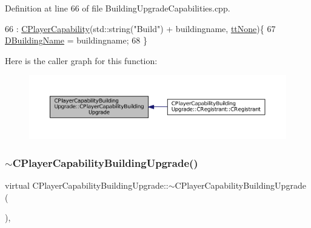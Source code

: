 Definition at line 66 of file Building\+Upgrade\+Capabilities.\+cpp.


\begin{DoxyCode}
66                                                                                                 : 
      \hyperlink{classCPlayerCapability_a303de62aba5d3f65d9a8e013c64a96c1}{CPlayerCapability}(std::string(\textcolor{stringliteral}{"Build"}) + buildingname, \hyperlink{classCPlayerCapability_a9d3450ed1532fd536bd6cbb1e2eef02fac78f0e806a6b0ead030d63c27c9ce929}{ttNone})\{
67     \hyperlink{classCPlayerCapabilityBuildingUpgrade_a244e767a3e669441cfb03c13bf703e64}{DBuildingName} = buildingname;
68 \}
\end{DoxyCode}
Here is the caller graph for this function\+:
\nopagebreak
\begin{figure}[H]
\begin{center}
\leavevmode
\includegraphics[width=350pt]{classCPlayerCapabilityBuildingUpgrade_a80ccec4b17a9e43914bec537dcbe1b9e_icgraph}
\end{center}
\end{figure}
\hypertarget{classCPlayerCapabilityBuildingUpgrade_abcef586e377c86c3da3cd698dca268ef}{}\label{classCPlayerCapabilityBuildingUpgrade_abcef586e377c86c3da3cd698dca268ef} 
\subsubsection{\texorpdfstring{$\sim$\+C\+Player\+Capability\+Building\+Upgrade()}{~CPlayerCapabilityBuildingUpgrade()}}
{\footnotesize\ttfamily virtual C\+Player\+Capability\+Building\+Upgrade\+::$\sim$\+C\+Player\+Capability\+Building\+Upgrade (\begin{DoxyParamCaption}{ }\end{DoxyParamCaption})\hspace{0.3cm}{\ttfamily [inline]}, {\ttfamily [virtual]}}



